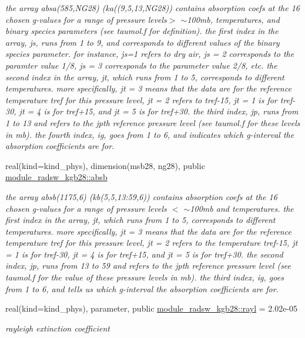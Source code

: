 \begin{Indent}
\begin{DoxyCompactItemize}
\begin{DoxyCompactList}\small\item\em the array absa(585,\+N\+G28) (ka((9,5,13,\+N\+G28)) contains absorption coefs at the 16 chosen g-\/values for a range of pressure levels$>$ $\sim$100mb, temperatures, and binary species parameters (see taumol.\+f for definition). the first index in the array, js, runs from 1 to 9, and corresponds to different values of the binary species parameter. for instance, js=1 refers to dry air, js = 2 corresponds to the paramter value 1/8, js = 3 corresponds to the parameter value 2/8, etc. the second index in the array, jt, which runs from 1 to 5, corresponds to different temperatures. more specifically, jt = 3 means that the data are for the reference temperature tref for this pressure level, jt = 2 refers to tref-\/15, jt = 1 is for tref-\/30, jt = 4 is for tref+15, and jt = 5 is for tref+30. the third index, jp, runs from 1 to 13 and refers to the jpth reference pressure level (see taumol.\+f for these levels in mb). the fourth index, ig, goes from 1 to 6, and indicates which g-\/interval the absorption coefficients are for. \end{DoxyCompactList}\item 
real(kind=kind\+\_\+phys), dimension(msb28, ng28), public \hyperlink{group__module__radsw__kgbnn_gac3834ddd9d9e2106dc739094c800d09b}{module\+\_\+radsw\+\_\+kgb28\+::absb}
\begin{DoxyCompactList}\small\item\em the array absb(1175,6) (kb(5,5,13\+:59,6)) contains absorption coefs at the 16 chosen g-\/values for a range of pressure levels $<$ $\sim$100mb and temperatures. the first index in the array, jt, which runs from 1 to 5, corresponds to different temperatures. more specifically, jt = 3 means that the data are for the reference temperature tref for this pressure level, jt = 2 refers to the temperature tref-\/15, jt = 1 is for tref-\/30, jt = 4 is for tref+15, and jt = 5 is for tref+30. the second index, jp, runs from 13 to 59 and refers to the jpth reference pressure level (see taumol.\+f for the value of these pressure levels in mb). the third index, ig, goes from 1 to 6, and tells us which g-\/interval the absorption coefficients are for. \end{DoxyCompactList}\item 
real(kind=kind\+\_\+phys), parameter, public \hyperlink{group__module__radsw__kgbnn_gaf3641febf88e97741b2cd86a56eda843}{module\+\_\+radsw\+\_\+kgb28\+::rayl} = 2.\+02e-\/05
\begin{DoxyCompactList}\small\item\em rayleigh extinction coefficient \end{DoxyCompactList}\item 

\end{DoxyCompactItemize}
\end{Indent}
